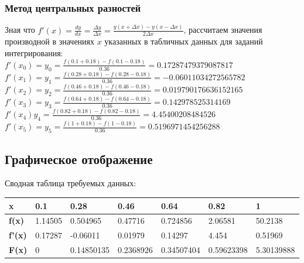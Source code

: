 \documentclass{article}
\begin{document}
\subsubsection{Метод центральных разностей}
Зная что $ f'(x) = 
 \frac{dy}{dx} =
 \frac{\Delta y}{\Delta x} =
 \frac{y(x + \Delta x) - y(x - \Delta x)}{2 \Delta x}$, рассчитаем значения
 производной в значениях $x$ указанных в табличных данных для заданий
 интегрирования: \\ 
$f'(x_{0}) = y_{0} = \frac{f(0.1 + 0.18) - f(0.1 - 0.18)}{0.36 } =0.17287479379087817$\\
$f'(x_{1})=y_{1} = \frac{f(0.28 + 0.18) - f(0.28 - 0.18)}{0.36 } =
-0.06011034272565782$\\
$f'(x_{2})=y_{2} = \frac{f(0.46 + 0.18) - f(0.46 - 0.18)}{0.36 } =
0.019790176636152165$\\
$f'(x_{3})=y_{3} = \frac{f(0.64 + 0.18) - f(0.64 - 0.18)}{0.36 } =
0.142978525314169 $\\
$f'(x_{4})y_{4} = \frac{f(0.82 + 0.18) - f(0.82 - 0.18)}{0.36 } =
4.45400208484526 $\\
$f'(x_{5})=y_{5} = \frac{f(1 + 0.18) - f(1 - 0.18)}{0.36 } = 0.5196971454256288
$
\subsection{Графическое отображение}
Сводная таблица требуемых данных:
\begin{table}[h!]
  \begin{tabular}{|l|l|l|l|l|l|l|}
  \hline
  \bfseries x & 0.1 & 0.28 & 0.46 & 0.64 & 0.82 & 1\\
  \hline
  \bfseries f(x) & 1.14505 & 0.504965 & 0.47716 & 0.724856 & 2.06581 & 50.2138\\
  \hline
  \bfseries f'(x) & 0.17287 & -0.06011 & 0.01979 & 0.14297 & 4.454 & 0.51969\\
  \hline
  \bfseries F(x) & 0 & 0.14850135 & 0.2368926 & 0.34507404 & 0.59623398 &5.30139888\\
  \hline
  \end{tabular}
\end{table}
\end{document}
